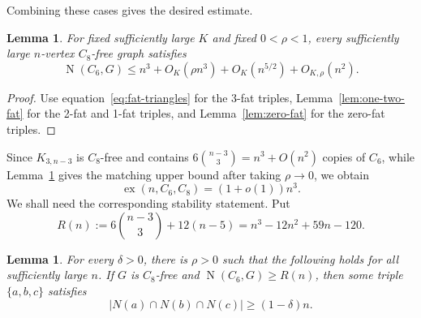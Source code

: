 \documentclass[11pt,letterpaper]{article}
\newtheorem{lemma}[theorem]{Lemma}
\newcommand{\ex}{\operatorname{ex}}
\newcommand{\N}{\operatorname{N}}
\begin{document}
Combining these cases gives the desired estimate.

\begin{lemma}\label{lem:global}
For fixed sufficiently large \(K\) and fixed \(0<\rho<1\), every sufficiently large \(n\)-vertex
\(C_8\)-free graph satisfies
\[
  \N(C_6,G)\le n^3+O_K(\rho n^3)+O_K(n^{5/2})+O_{K,\rho}(n^2).
\]
\end{lemma}

\begin{proof}
Use equation~\eqref{eq:fat-triangles} for the 3-fat triples, Lemma~\ref{lem:one-two-fat} for the
2-fat and 1-fat triples, and Lemma~\ref{lem:zero-fat} for the zero-fat triples.
\end{proof}

Since \(K_{3,n-3}\) is \(C_8\)-free and contains \(6\binom{n-3}{3}=n^3+O(n^2)\) copies of
\(C_6\), while Lemma~\ref{lem:global} gives the matching upper bound after taking
\(\rho\to0\), we obtain
\[
  \ex(n,C_6,C_8)=(1+o(1))n^3.
\]
We shall need the corresponding stability statement. Put
\begin{equation}\label{eq:Rn-def}
  R(n):=6\binom{n-3}{3}+12(n-5)=n^3-12n^2+59n-120.
\end{equation}

\begin{lemma}\label{lem:stability}
For every \(\delta>0\), there is \(\rho>0\) such that the following holds for all sufficiently large
\(n\). If \(G\) is \(C_8\)-free and $\N(C_6,G)\ge R(n)$,
then some triple \(\{a,b,c\}\) satisfies
\[
  |N(a)\cap N(b)\cap N(c)|\ge(1-\delta)n.
\]
\end{lemma}
\end{document}

